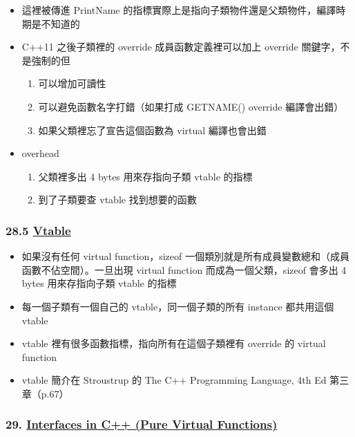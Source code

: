 \documentclass[11pt]{article}
\providecommand{\tightlist}{%
      \setlength{\itemsep}{0pt}\setlength{\parskip}{0pt}}
\begin{document}
\begin{itemize}
\tightlist
\item
  這裡被傳進 PrintName
  的指標實際上是指向子類物件還是父類物件，編譯時期是不知道的
\item
  C++11 之後子類裡的 override 成員函數定義裡可以加上 override
  關鍵字，不是強制的但

  \begin{enumerate}
  \def\labelenumi{\arabic{enumi}.}
  \tightlist
  \item
    可以增加可讀性
  \item
    可以避免函數名字打錯（如果打成 GETNAME() override 編譯會出錯）
  \item
    如果父類裡忘了宣告這個函數為 virtual 編譯也會出錯
  \end{enumerate}
\item
  overhead

  \begin{enumerate}
  \def\labelenumi{\arabic{enumi}.}
  \tightlist
  \item
    父類裡多出 4 bytes 用來存指向子類 vtable 的指標
  \item
    到了子類要查 vtable 找到想要的函數
  \end{enumerate}
\end{itemize}

\hypertarget{vtable}{%
\subsubsection{\texorpdfstring{28.5
\href{https://www.youtube.com/watch?v=VdvL8kFBubU}{Vtable}}{28.5 Vtable}}\label{vtable}}

\begin{itemize}
\tightlist
\item
  如果沒有任何 virtual function，sizeof
  一個類別就是所有成員變數總和（成員函數不佔空間）。一旦出現 virtual
  function 而成為一個父類，sizeof 會多出 4 bytes 用來存指向子類 vtable
  的指標
\item
  每一個子類有一個自己的 vtable，同一個子類的所有 instance 都共用這個
  vtable
\item
  vtable 裡有很多函數指標，指向所有在這個子類裡有 override 的 virtual
  function
\item
  vtable 簡介在 Stroustrup 的 The C++ Programming Language, 4th Ed
  第三章（p.67）
\end{itemize}

\hypertarget{interfaces-in-c-pure-virtual-functions}{%
\subsubsection{\texorpdfstring{29.
\href{https://www.youtube.com/watch?v=UWAdd13EfM8\&list=PLlrATfBNZ98dudnM48yfGUldqGD0S4FFb\&index=30\&t=0s}{Interfaces
in C++ (Pure Virtual
Functions)}}{29. Interfaces in C++ (Pure Virtual Functions)}}\label{interfaces-in-c-pure-virtual-functions}}
\end{document}
